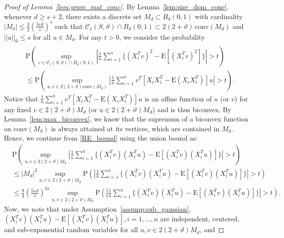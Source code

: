 \documentclass[ejsv2,noshowframe]{imsart}
\theoremstyle{plain}
\theoremstyle{definition}
\theoremstyle{remark}
\newcommand{\norm}[1]{\left|\left| #1 \right|\right|}
\begin{document}
\begin{proof}[Proof of Lemma~\ref{lem:gram_mat_conc}]
	By Lemma~\ref{lem:size_dom_cone}, whenever $d\geq s+2$, there exists a discrete set $M_d\subset B_d(0,1)$ with cardinality $|M_d| \leq \frac{3}{2} \left(\frac{5ed}{s} \right)^s$ such that $\mathcal{C}_1(S,\vartheta) \cap B_d(0,1) \subset 2(2+\vartheta)\, \mathrm{conv}(M_d)$ and $\norm{u}_0 \leq s$ for all $u\in M_d$. For any $t>0$, we consider the probability
	\begin{align}
		\label{RE_bound}
		\begin{split}
			&\mathrm{P}\left(\sup_{v\in \mathcal{C}_1(S,\vartheta) \cap B_d(0,1)}\left|\frac{1}{n}\sum_{i=1}^n \Big\{(X_i^T v)^2 - \mathrm{E}\left[(X_i^T v)^2 \right]\Big\}\right| > t \right) \\
			&\leq \mathrm{P}\left(\sup_{u,v\in 2(2+\vartheta) \mathrm{conv}(M_d)} \left|\frac{1}{n} \sum_{i=1}^n v^T\left[X_iX_i^T - \mathrm{E}\left(X_iX_i^T \right) \right]u\right| > t \right).
		\end{split}
	\end{align}
	Notice that $\frac{1}{n} \sum_{i=1}^n v^T\left[X_iX_i^T - \mathrm{E}\left(X_iX_i^T \right) \right]u$ is an affine function of $u$ (or $v$) for any fixed $v\in 2(2+\vartheta) M_d$ (or $u\in 2(2+\vartheta) M_d$) and is thus biconvex. By Lemma~\ref{lem:max_biconvex}, we know that the supremum of a biconvex function on $\mathrm{conv}(M_d)$ is always attained at its vertices, which are contained in $M_d$. Hence, we continue from \eqref{RE_bound} using the union bound as:
	\begin{align*}
		&\mathrm{P}\left(\sup_{u,v\in 2(2+\vartheta)M_d} \left|\frac{1}{n} \sum_{i=1}^n \Big\{(X_i^T v)(X_i^T u) - \mathrm{E}\left[(X_i^T v)(X_i^T u) \right] \Big\}\right| > t \right)\\
		&\leq |M_d|^2 \sup_{u,v\in 2(2+\vartheta)M_d}\mathrm{P}\left(\left|\frac{1}{n} \sum_{i=1}^n \Big\{(X_i^T v)(X_i^T u) - \mathrm{E}\left[(X_i^T v)(X_i^T u) \right] \Big\}\right| > t \right)\\
		&\leq \frac{9}{4} \left(\frac{5ed}{s} \right)^{2s} \sup_{u,v\in 2(2+\vartheta)M_d}\mathrm{P}\left(\left|\frac{1}{n} \sum_{i=1}^n \Big\{(X_i^T v)(X_i^T u) - \mathrm{E}\left[(X_i^T v)(X_i^T u) \right] \Big\}\right| > t \right).
	\end{align*}
	Now, we note that under Assumption~\ref{assump:sub_gaussian}, $(X_i^T v)(X_i^T u) - \mathrm{E}\left[(X_i^T v)(X_i^T u) \right], i=1,...,n$ are independent, centered, and sub-exponential random variables for all $u,v \in 2(2+\vartheta)M_d$, and

\end{proof}
\end{document}
